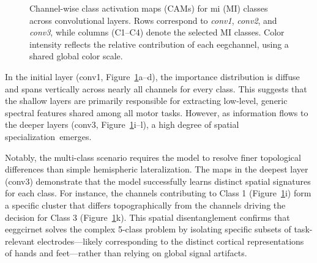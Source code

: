 \begin{figure}[H]
{\begin{minipage}[c]{0.94\textwidth}
\hspace{-6pt}

\end{minipage}
}

\caption{Channel-wise class activation maps (CAMs) for \gls{mi} (MI) classes across convolutional layers.
Rows correspond to \textit{conv1}, \textit{conv2}, and \textit{conv3}, while columns (C1--C4) denote the selected MI classes.
Color intensity reflects the relative contribution of each \gls{eeg}channel, using a shared global color scale.}

\label{fig:cams_subjects1}
\end{figure}


In the initial layer (conv1, \mbox{Figure~\ref{fig:cams_subjects1}a--d}), the importance distribution is diffuse and spans vertically across nearly all channels for every class. This suggests that the shallow layers are primarily responsible for extracting low-level, generic spectral features shared among all motor tasks. However, as information flows to the deeper layers (conv3, \mbox{Figure~\ref{fig:cams_subjects1}}i--l), a high degree of spatial \mbox{specialization emerges}.

Notably, the multi-class scenario requires the model to resolve finer topological differences than simple hemispheric lateralization. The maps in the deepest layer (conv3) demonstrate that the model successfully learns distinct spatial signatures for each class. For instance, the channels contributing to Class 1 (Figure~\ref{fig:cams_subjects1}i) form a specific cluster that differs topographically from the channels driving the decision for Class 3 (Figure~\ref{fig:cams_subjects1}k). This spatial disentanglement confirms that \gls{eeggcirnet} solves the complex 5-class problem by isolating specific subsets of task-relevant electrodes—likely corresponding to the distinct cortical representations of hands and feet—rather than relying on global signal artifacts.

